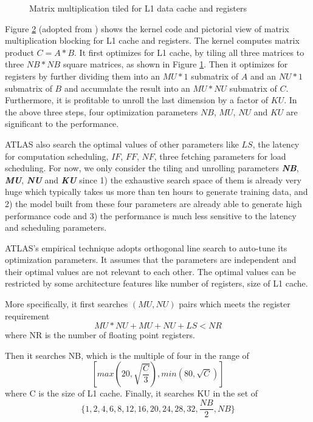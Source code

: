 \begin{figure}
\begin{subfigure}[t]{1.0\linewidth}
    \caption{}
    \label{fig:ATLAS_pic}
  \end{subfigure}
  \caption{Matrix multiplication tiled for L1 data cache and registers}
  \label{fig:ATLAS}
\end{figure}

  Figure \ref{fig:ATLAS} (adopted from \cite{yotov2005search}) shows the kernel code and pictorial view of matrix multiplication 
  blocking for L1 cache and registers. The kernel computes matrix product $C=A*B$. It first optimizes for L1 cache, by tiling all three matrices
  to three $NB*NB$ square matrices, as shown in Figure \ref{fig:ATLAS_pic}. Then it optimizes for registers by further dividing them  
  into an $MU*1$ submatrix of $A$ and an $NU*1$ submatrix of $B$ and accumulate the result into an $MU*NU$ submatrix of $C$. 
  Furthermore, it is profitable to unroll the last dimension by a factor of $KU$.
  In the above three steps, four optimization parameters $NB$, $MU$, $NU$ and $KU$ are significant to the performance. \par

  ATLAS also search the optimal values of other parameters like $LS$, the latency for computation scheduling, $IF$, $FF$, $NF$, three fetching parameters 
  for load scheduling. For now, we only consider the tiling and unrolling parameters \textbf{\textit{NB}}, \textbf{\textit{MU}}, \textbf{\textit{NU}} and \textbf{\textit{KU}} since 1) the exhaustive search space of them 
  is already very huge which typically takes us more than ten hours to generate training data, and 2) the model built from these four parameters are already able to
  generate high performance code and 3) the performance is much less sensitive to the latency and scheduling parameters.
  \par
  
  ATLAS's empirical technique adopts orthogonal line search to auto-tune its optimization parameters. 
  It assumes that the parameters are independent and their optimal values are not relevant to each other. The optimal values can be
  restricted by some architecture features like number of registers, size of L1 cache.\par
  More specifically, it first searches $(MU, NU)$ pairs which meets the register requirement
  \[ MU*NU + MU + NU + LS < NR \]
  where NR is the number of floating point registers.\par
  Then it searches NB, which is the multiple of four in the range of 
  \[ [max(20, \sqrt{\frac{C}{3}}), min(80, \sqrt{C}) ] \]
  where C is the size of L1 cache. 
  Finally, it searches KU in the set of 
  \[ \{1, 2, 4, 6, 8, 12, 16, 20, 24, 28, 32, \frac{NB}{2}, NB \} \]

